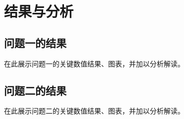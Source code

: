 \section{结果与分析}


\subsection{问题一的结果}

在此展示问题一的关键数值结果、图表，并加以分析解读。

\subsection{问题二的结果}

在此展示问题二的关键数值结果、图表，并加以分析解读。

